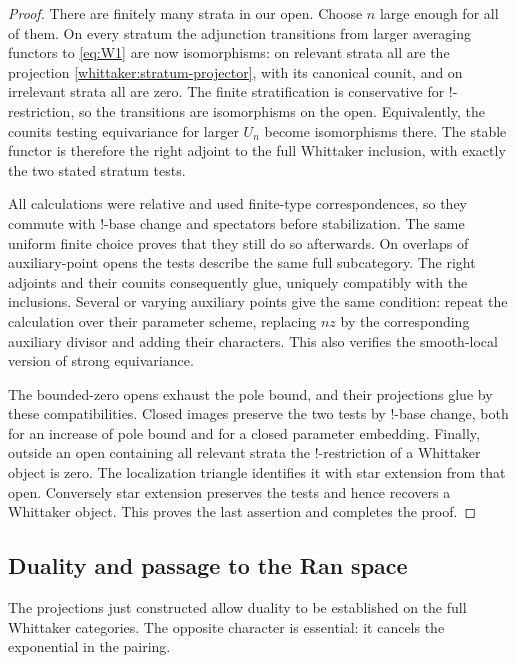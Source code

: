 \begin{proof}
There are finitely many strata in our open. Choose $n$ large enough for
all of them. On every stratum the adjunction transitions from larger
averaging functors to \eqref{eq:W1} are now isomorphisms: on relevant strata
all are the projection \eqref{whittaker:stratum-projector}, with its
canonical counit, and on irrelevant strata all are zero. The finite
stratification is conservative for $!$-restriction, so the transitions are
isomorphisms on the open. Equivalently, the counits testing equivariance
for larger $U_n$ become isomorphisms there. The stable functor is therefore
the right adjoint to the full Whittaker inclusion, with exactly the two
stated stratum tests.

All calculations were relative and used finite-type correspondences, so
they commute with $!$-base change and spectators before stabilization.
The same uniform finite choice proves that they still do so afterwards.
On overlaps of auxiliary-point opens the tests describe the same full
subcategory. The right adjoints and their counits consequently glue,
uniquely compatibly with the inclusions. Several or varying auxiliary
points give the same condition: repeat the calculation over their
parameter scheme, replacing $nz$ by the corresponding auxiliary divisor
and adding their characters. This also verifies the smooth-local version
of strong equivariance.

The bounded-zero opens exhaust the pole bound, and their projections glue
by these compatibilities. Closed images preserve the two tests by
$!$-base change, both for an increase of pole bound and for a closed
parameter embedding. Finally, outside an open containing all relevant
strata the $!$-restriction of a Whittaker object is zero. The localization
triangle identifies it with star extension from that open. Conversely
star extension preserves the tests and hence recovers a Whittaker object.
This proves the last assertion and completes the proof.
\end{proof}

\subsection{Duality and passage to the Ran space}

The projections just constructed allow duality to be established on the
full Whittaker categories. The opposite character is essential: it
cancels the exponential in the pairing.

